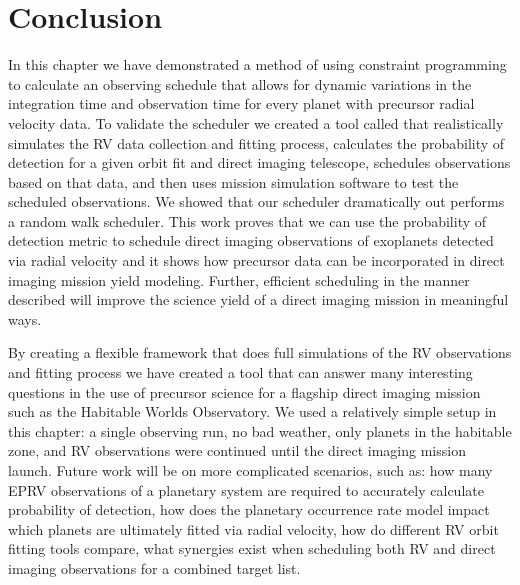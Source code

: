 \section{Conclusion}

In this chapter we have demonstrated a method of using constraint programming
to calculate an observing schedule that allows for dynamic variations in the
integration time and observation time for every planet with precursor radial
velocity data. To validate the scheduler we created a tool called
 that realistically simulates the RV data collection and
fitting process, calculates the probability of detection for a given orbit fit
and direct imaging telescope, schedules observations based on that data, and
then uses mission simulation software to test the scheduled observations. We
showed that our scheduler dramatically out performs a random walk scheduler.
This work proves that we can use the probability of detection metric to
schedule direct imaging observations of exoplanets detected via radial velocity
and it shows how precursor data can be incorporated in direct imaging mission
yield modeling. Further, efficient scheduling in the manner described will
improve the science yield of a direct imaging mission in meaningful ways.

By creating a flexible framework that does full simulations of the RV
observations and fitting process we have created a tool that can answer many
interesting questions in the use of precursor science for a flagship direct
imaging mission such as the Habitable Worlds Observatory. We used a relatively
simple setup in this chapter: a single observing run, no bad weather, only
planets in the habitable zone, and RV observations were continued until the
direct imaging mission launch. Future work will be on more complicated
scenarios, such as: how many EPRV observations of a planetary system are
required to accurately calculate probability of detection, how does the
planetary occurrence rate model impact which planets are ultimately fitted via
radial velocity, how do different RV orbit fitting tools compare, what
synergies exist when scheduling both RV and direct imaging observations for a
combined target list.

